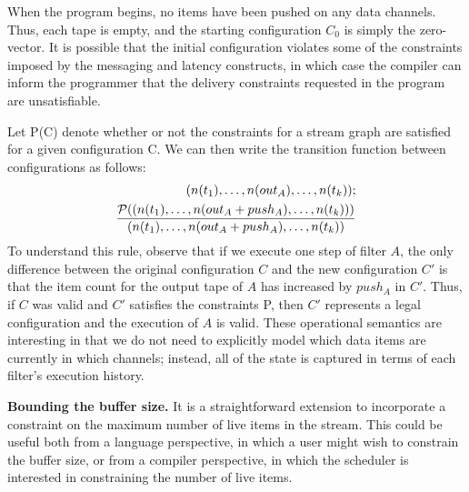 When the program begins, no items have been pushed on any data
channels.  Thus, each tape is empty, and the starting configuration
$C_0$ is simply the zero-vector.  It is possible that the initial
configuration violates some of the constraints imposed by the
messaging and latency constructs, in which case the compiler can
inform the programmer that the delivery constraints requested in the
program are unsatisfiable.

Let {\cal P}(C) denote whether or not the constraints for a stream
graph are satisfied for a given configuration C.  We can then write
the transition function between configurations as follows:
\begin{align*}
(n(t_1), \dots , n(out_A), \dots, n(t_k)); \\ \frac{{\cal P}((n(t_1), \dots , n(out_A + push_A), \dots, n(t_k)))}{(n(t_1), \dots , n(out_A + push_A), \dots, n(t_k))}
\end{align*}
To understand this rule, observe that if we execute one step of filter
$A$, the only difference between the original configuration $C$ and
the new configuration $C'$ is that the item count for the output tape
of $A$ has increased by $push_A$ in $C'$.  Thus, if $C$ was valid and
$C'$ satisfies the constraints {\cal P}, then $C'$ represents a legal
configuration and the execution of $A$ is valid.  These operational
semantics are interesting in that we do not need to explicitly model
which data items are currently in which channels; instead, all of the
state is captured in terms of each filter's execution history.

{\bf Bounding the buffer size.}  It is a straightforward extension to
incorporate a constraint on the maximum number of live items in the
stream.  This could be useful both from a language perspective, in
which a user might wish to constrain the buffer size, or from a
compiler perspective, in which the scheduler is interested in
constraining the number of live items.

